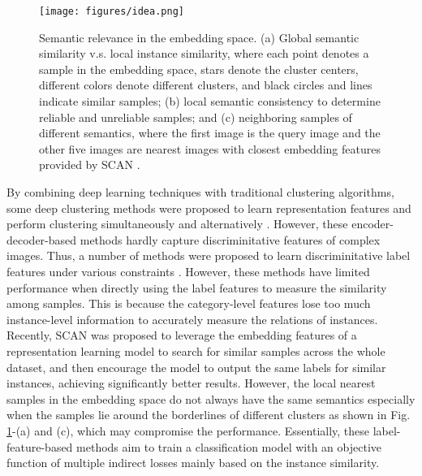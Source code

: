 \documentclass[10pt,twocolumn,letterpaper]{article}
\begin{document}
\begin{figure}[bt!]
    \centering
    \texttt{[image: figures/idea.png]}
    \caption{Semantic relevance in the embedding space. (a) Global semantic similarity v.s. local instance similarity, where each point denotes a sample in the embedding space, stars denote the cluster centers, different colors denote different clusters, and black circles and lines indicate similar samples; (b) local semantic consistency to determine reliable and unreliable samples; and (c) neighboring samples of different semantics, where the first image is the query image and the other five images are nearest images with closest embedding features provided by SCAN \cite{scan}.}
    \label{fig_general}
\end{figure}

By combining deep learning techniques with traditional clustering algorithms, some deep clustering methods were proposed to learn representation features and perform clustering simultaneously and alternatively \cite{Xie2016, LI2018161, DCN2016, DeepCluster2017, Zhang_2019_CVPR, DEPICT2017, VaDE2017, GMVAE, DASC2018}. However, these encoder-decoder-based methods hardly capture discriminitative features of complex images.
Thus, a number of methods were proposed to learn discriminitative label features under various constraints \cite{DAIC2017,IIC2019,Wu_2019_ICCV,gatcluster,gatcluster, cc}. However, these methods have limited performance when directly using the label features to measure the similarity among samples. This is because the category-level features lose too much instance-level information to accurately measure the relations of instances.
Recently, SCAN \cite{scan} was proposed to leverage the embedding features of a representation learning model to search for similar samples across the whole dataset, and then encourage the model to output the same labels for similar instances, achieving significantly better results.
However, the local nearest samples in the embedding space do not always have the same semantics especially when the samples lie around the borderlines of different clusters as shown in Fig. \ref{fig_general}-(a) and (c), which may compromise the performance.
Essentially, these label-feature-based methods aim to train a classification model with an objective function of multiple indirect losses mainly based on the instance similarity.
\end{document}
